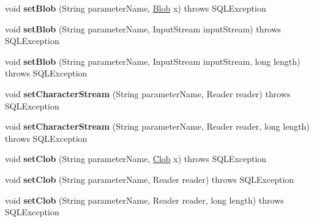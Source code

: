 \begin{DoxyCompactItemize}
void {\bfseries set\+Blob} (String parameter\+Name, \mbox{\hyperlink{classcom_1_1mysql_1_1jdbc_1_1_blob}{Blob}} x)  throws S\+Q\+L\+Exception 
\item 
\mbox{\label{classcom_1_1mysql_1_1jdbc_1_1_callable_statement_a10711e6600470b86e000082b9bdf95c6}} 
void {\bfseries set\+Blob} (String parameter\+Name, Input\+Stream input\+Stream)  throws S\+Q\+L\+Exception 
\item 
\mbox{\label{classcom_1_1mysql_1_1jdbc_1_1_callable_statement_aba57e74a9125dde08dc097109c9b897e}} 
void {\bfseries set\+Blob} (String parameter\+Name, Input\+Stream input\+Stream, long length)  throws S\+Q\+L\+Exception 
\item 
\mbox{\label{classcom_1_1mysql_1_1jdbc_1_1_callable_statement_a74e4ecc884cb971a9b389f380f786a61}} 
void {\bfseries set\+Character\+Stream} (String parameter\+Name, Reader reader)  throws S\+Q\+L\+Exception 
\item 
\mbox{\label{classcom_1_1mysql_1_1jdbc_1_1_callable_statement_a0d390e05d37522e5ed9c99a4e53ac62b}} 
void {\bfseries set\+Character\+Stream} (String parameter\+Name, Reader reader, long length)  throws S\+Q\+L\+Exception 
\item 
\mbox{\label{classcom_1_1mysql_1_1jdbc_1_1_callable_statement_a1e7ab9fa38ab2942fbe06f34adfff59c}} 
void {\bfseries set\+Clob} (String parameter\+Name, \mbox{\hyperlink{classcom_1_1mysql_1_1jdbc_1_1_clob}{Clob}} x)  throws S\+Q\+L\+Exception 
\item 
\mbox{\label{classcom_1_1mysql_1_1jdbc_1_1_callable_statement_aa4ed8776ca792d6e31aeca4c6c178035}} 
void {\bfseries set\+Clob} (String parameter\+Name, Reader reader)  throws S\+Q\+L\+Exception 
\item 
\mbox{\label{classcom_1_1mysql_1_1jdbc_1_1_callable_statement_ae5191fc837f89761074daf18e4a6fc08}} 
void {\bfseries set\+Clob} (String parameter\+Name, Reader reader, long length)  throws S\+Q\+L\+Exception 

\end{DoxyCompactItemize}
